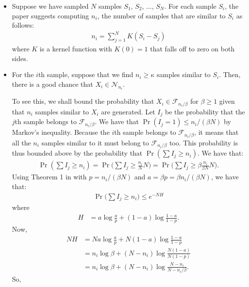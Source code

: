 \documentclass[10pt]{article}
\begin{document}
  \begin{itemize}
  	\item Suppose we have sampled $N$ samples $S_1$, $S_2$, $\dots$, $S_N$. For each sample $S_i$, the paper suggests computing $n_i$, the number of samples that are similar to $S_i$ as follows:
  	\begin{align*}
  		n_i = \sum_{j = 1}^N K(S_i - S_j)
  	\end{align*}
  	where $K$ is a kernel function with $K(0) = 1$ that falls off to zero on both sides.

  	\item For the $i$th sample, suppose that we find $n_i \geq \kappa$ samples similar to $S_i$. Then, there is a good chance that $X_i \in \mathcal{N}_{n_i}$.

  	To see this, we shall bound the probability that $X_i \in \mathcal{F}_{n_i / \beta}$ for $\beta \geq 1$ given that $n_i$ samples similar to $X_i$ are generated. Let $I_j$ be the probability that the $j$th sample belongs to $\mathcal{F}_{n_i / \beta}$. We have that $\Pr(I_j = 1) \leq n_i/ (\beta N)$ by Markov's inequality. Because the $i$th sample belongs to $\mathcal{F}_{n_i / \beta}$, it means that all the $n_i$ samples similar to it must belong to $\mathcal{F}_{n_i / \beta}$ too. This probability is thus bounded above by the probability that $\Pr(\sum I_j \geq n_i)$. We have that:
  	\begin{align*}
  		\Pr(\sum I_j \geq n_i) 
  		= \Pr\bigg(\sum I_j \geq \frac{n_i}{N} N \bigg) 
  		=\Pr\bigg(\sum I_j \geq \beta \frac{n_i}{\beta N} N \bigg).
  	\end{align*}
  	Using Theorem 1 in \cite{Arratia:1989} with $p = n_i/ (\beta N)$ and $a = \beta p = \beta n_i/ (\beta N)$, we have that:
  	\begin{align*}
  		\Pr\big(\sum I_j \geq n_i\big) \leq e^{-N H}
  	\end{align*}
  	where
  	\begin{align*}
  		H 
  		&= a \log \frac{a}{p} + (1-a) \log \frac{1-a}{1-p}.
  	\end{align*}
  	Now,
  	\begin{align*}
  		NH 
  		&= Na \log \frac{a}{p} + N (1-a) \log \frac{1-a}{1-p} \\
  		&= n_i \log \beta +  (N-n_i) \log \frac{ N(1-a)}{N(1-p)} \\
  		&= n_i \log \beta + (N-n_i) \log \frac{N-n_i}{N-n_i/\beta}.
  	\end{align*}
  	So,
  	\begin{align*}

\end{align*}
\end{itemize}
\end{document}
